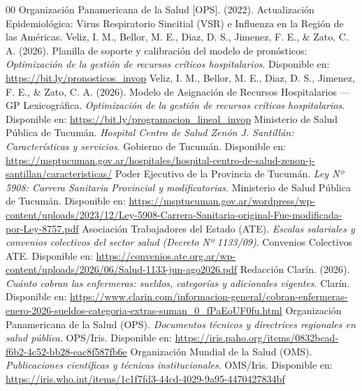 \documentclass[conference]{IEEEtran}
\begin{document}
\begin{thebibliography}{00}
     Organización Panamericana de la Salud [OPS]. (2022). Actualización Epidemiológica: Virus Respiratorio Sincitial (VSR) e Influenza en la Región de las Américas.
     Veliz, I. M., Bellor, M. E., Diaz, D. S., Jimenez, F. E., \& Zato, C. A. (2026). Planilla de soporte y calibración del modelo de pronósticos: \emph{Optimización de la gestión de recursos críticos hospitalarios}. Disponible en: \url{https://bit.ly/pronosticos_invop}
     Veliz, I. M., Bellor, M. E., Diaz, D. S., Jimenez, F. E., \& Zato, C. A. (2026). Modelo de Asignación de Recursos Hospitalarios — GP Lexicográfica. \emph{Optimización de la gestión de recursos críticos hospitalarios}. Disponible en: \url{https://bit.ly/programacion_lineal_invop}
     Ministerio de Salud Pública de Tucumán. \emph{Hospital Centro de Salud Zenón J. Santillán: Características y servicios}. Gobierno de Tucumán. Disponible en: \url{https://msptucuman.gov.ar/hospitales/hospital-centro-de-salud-zenon-j-santillan/caracteristicas/}
     Poder Ejecutivo de la Provincia de Tucumán. \emph{Ley Nº 5908: Carrera Sanitaria Provincial y modificatorias}. Ministerio de Salud Pública de Tucumán. Disponible en: \url{https://msptucuman.gov.ar/wordpress/wp-content/uploads/2023/12/Ley-5908-Carrera-Sanitaria-original-Fue-modificada-por-Ley-8757.pdf}
     Asociación Trabajadores del Estado (ATE). \emph{Escalas salariales y convenios colectivos del sector salud (Decreto Nº 1133/09)}. Convenios Colectivos ATE. Disponible en: \url{https://convenios.ate.org.ar/wp-content/uploads/2026/06/Salud-1133-jun-ago2026.pdf}
     Redacción Clarín. (2026). \emph{Cuánto cobran las enfermeras: sueldos, categorías y adicionales vigentes}. Clarín. Disponible en: \url{https://www.clarin.com/informacion-general/cobran-enfermeras-enero-2026-sueldos-categoria-extras-suman_0_fPaEoUF0fu.html}
     Organización Panamericana de la Salud (OPS). \emph{Documentos técnicos y directrices regionales en salud pública}. OPS/Iris. Disponible en: \url{https://iris.paho.org/items/0832bcad-f6b2-4c52-bb28-eac8f587fb6e}
     Organización Mundial de la Salud (OMS). \emph{Publicaciones científicas y técnicas institucionales}. OMS/Iris. Disponible en: \url{https://iris.who.int/items/1c1f7fd3-44cd-4029-9a95-4470427834bf}
\end{thebibliography}
\end{document}
